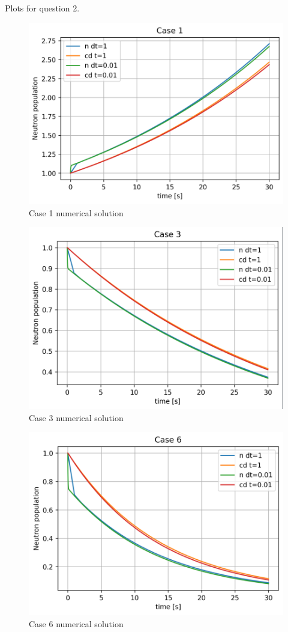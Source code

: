 \documentclass[12pt,fleqn, parskip=full]{scrartcl}
\begin{document}
Plots for question 2. 
\begin{figure}[H]
	\centering
	\includegraphics[scale=1]{Image_14_hw_4}
	\caption{Case 1 numerical solution}
\end{figure}

\begin{figure}[H]
	\centering
	\includegraphics[scale=1]{Image_15_hw_4}
	\caption{Case 3 numerical solution}
\end{figure}

\begin{figure}[H]
	\centering
	\includegraphics[scale=1]{Image_16_hw_4}
	\caption{Case 6 numerical solution}
\end{figure}
\end{document}
